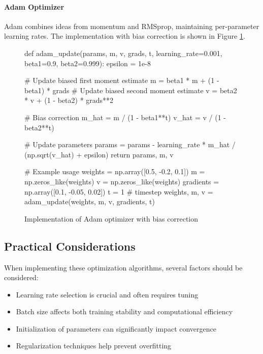 \paragraph{Adam Optimizer}
Adam combines ideas from momentum and RMSprop, maintaining per-parameter learning rates. The implementation with bias correction is shown in Figure \ref{fig:adam_implementation}.

\begin{figure}[h]
\begin{pythoncode}
def adam_update(params, m, v, grads, t, 
                learning_rate=0.001, beta1=0.9, beta2=0.999):
    epsilon = 1e-8
    
    # Update biased first moment estimate
    m = beta1 * m + (1 - beta1) * grads
    # Update biased second moment estimate
    v = beta2 * v + (1 - beta2) * grads**2
    
    # Bias correction
    m_hat = m / (1 - beta1**t)
    v_hat = v / (1 - beta2**t)
    
    # Update parameters
    params = params - learning_rate * m_hat / (np.sqrt(v_hat) + epsilon)
    return params, m, v

# Example usage
weights = np.array([0.5, -0.2, 0.1])
m = np.zeros_like(weights)
v = np.zeros_like(weights)
gradients = np.array([0.1, -0.05, 0.02])
t = 1  # timestep
weights, m, v = adam_update(weights, m, v, gradients, t)
\end{pythoncode}
\caption{Implementation of Adam optimizer with bias correction}
\label{fig:adam_implementation}
\end{figure}

\subsection{Practical Considerations}

When implementing these optimization algorithms, several factors should be considered:

\begin{itemize}[noitemsep]
    \item Learning rate selection is crucial and often requires tuning
    \item Batch size affects both training stability and computational efficiency
    \item Initialization of parameters can significantly impact convergence
    \item Regularization techniques help prevent overfitting
\end{itemize}

